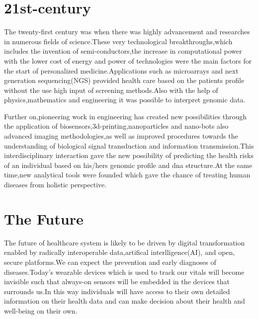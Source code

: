 \documentclass[12pt,A4paper]{article}
\begin{document}
\section{21st-century}
 The twenty-first century was when there was highly advancement and researches in numerous fields of science.These very technological breakthroughs,which includes the invention of semi-conductors,the increase in computational power with the lower cost of energy and power of technologies were the main factors for the start of personalized medicine.Applications such as microarrays and next generation sequencing(NGS) provided health care based on the patients profile without the use high input of screening methods.Also with the help of physics,mathematics and engineering it was possible to interpret genomic data.

Further on,pioneering work in engineering has created new possibilities through the application of biosensors,3d-printing,nanoparticles and nano-bots also advanced imaging methodologies,as well as improved procedures towards the understanding of biological signal transduction and information transmission.This interdisciplinary interaction gave the new possibility of predicting the health risks of an individual based on his/hers genomic profile and dna structure.At the same time,new analytical tools
were founded which gave the chance of treating human diseases from holistic perspective.
\section{The Future}
The future of healthcare system is likely to be driven by digital transformation enabled by radically interoperable data,artifical interlligence(AI), and open, secure platforms.We can expect the prevention and early diagnoses of diseases.Today's wearable devices which is used to track our vitals will become invisible such that always-on sensors will be embedded in the devices that surrounds us.In this way individuals will have access to their own detailed information on their health data and can make decision about their health and well-being on their own.
\end{document}
